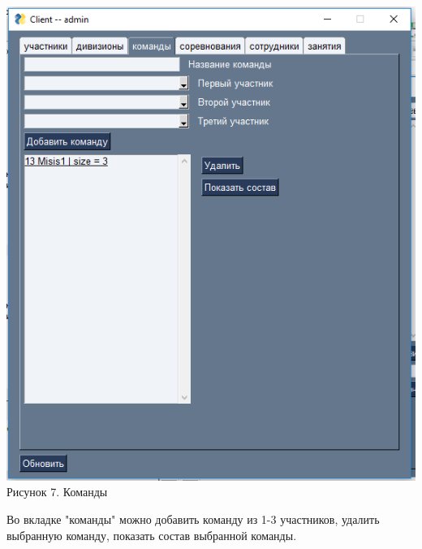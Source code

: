 \documentclass[a4paper,12pt,preview]{report} %
\begin{document}
	
	
	\begin{center}
		\includegraphics{teams.PNG} \\
		Рисунок 7. Команды
	\end{center}
	
	Во вкладке "команды" можно добавить команду из 1-3 участников, удалить выбранную команду, показать состав выбранной команды.
	
	
	
	
	
\end{document}
